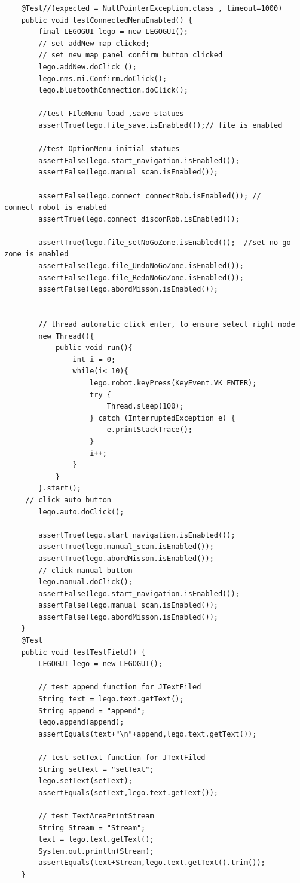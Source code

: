 \documentclass[11pt, a4paper]{report}
\begin{document}
\begin{lstlisting}
	@Test//(expected = NullPointerException.class , timeout=1000)
	public void testConnectedMenuEnabled() {
		final LEGOGUI lego = new LEGOGUI();
		// set addNew map clicked;
		// set new map panel confirm button clicked
		lego.addNew.doClick ();
		lego.nms.mi.Confirm.doClick();		
		lego.bluetoothConnection.doClick();
		
		//test FIleMenu load ,save statues
		assertTrue(lego.file_save.isEnabled());// file is enabled
				
		//test OptionMenu initial statues
		assertFalse(lego.start_navigation.isEnabled());
		assertFalse(lego.manual_scan.isEnabled());
				
		assertFalse(lego.connect_connectRob.isEnabled()); // connect_robot is enabled
		assertTrue(lego.connect_disconRob.isEnabled());
				
		assertTrue(lego.file_setNoGoZone.isEnabled());  //set no go zone is enabled
		assertFalse(lego.file_UndoNoGoZone.isEnabled());
		assertFalse(lego.file_RedoNoGoZone.isEnabled());
		assertFalse(lego.abordMisson.isEnabled());
		
		
		// thread automatic click enter, to ensure select right mode
		new Thread(){
        	public void run(){
        		int i = 0;
        		while(i< 10){
					lego.robot.keyPress(KeyEvent.VK_ENTER);
					try {
						Thread.sleep(100);
					} catch (InterruptedException e) {
						e.printStackTrace();
					}
					i++;
				}
        	}    	
        }.start();
     // click auto button
		lego.auto.doClick();
				
		assertTrue(lego.start_navigation.isEnabled());
		assertTrue(lego.manual_scan.isEnabled());
		assertTrue(lego.abordMisson.isEnabled());
		// click manual button
		lego.manual.doClick();
		assertFalse(lego.start_navigation.isEnabled());
		assertFalse(lego.manual_scan.isEnabled());
		assertFalse(lego.abordMisson.isEnabled());
	}
	@Test
	public void testTestField() {
		LEGOGUI lego = new LEGOGUI();
		
		// test append function for JTextFiled
		String text = lego.text.getText();
		String append = "append";
		lego.append(append);
		assertEquals(text+"\n"+append,lego.text.getText());
					
		// test setText function for JTextFiled
		String setText = "setText";
		lego.setText(setText);
		assertEquals(setText,lego.text.getText());
		
		// test TextAreaPrintStream
		String Stream = "Stream";
		text = lego.text.getText();
		System.out.println(Stream);
		assertEquals(text+Stream,lego.text.getText().trim());
	}
	

\end{lstlisting}
\end{document}
